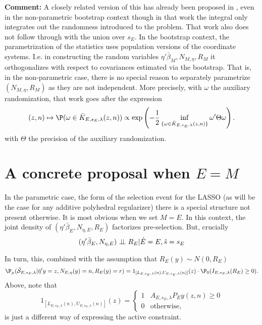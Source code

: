 \documentclass{article}
\newcommand{\OLS}{\bar{\beta}}
\newcommand{\indep}{\perp\kern-5pt\perp}
\begin{document}
        {\bf Comment:} A closely related version of this has already been
        proposed in \cite{snigdha:jelena}, even in the non-parametric
        bootstrap context though in that work the integral only
        integrates out the randomness introduced to the problem.  That
        work also does not follow through with the union over $s_E$.
        In the bootstrap context, the parametrization of the
        statistics uses population versions of the coordinate
        systems. I.e. in constructing the random variables
        $\eta'\OLS_M, N_{M,\eta}, R_M$ it orthogonalizes with respect
        to covariances estimated via the bootstrap.  That is, in the
        non-parametric case, there is no special reason to separately
        parametrize $(N_{M,\eta}, R_M)$ as they are not independent.
        More precisely, with $\omega$ the auxiliary randomization,
        that work goes after the expression
        \begin{equation}
          \label{eq:LD:rand}
        (z,n) \mapsto \P(\omega \in \bar{K}_{E,s_E,\lambda}(z,n)) \propto
          \exp\left(-\frac{1}{2} \inf_{\{\omega \in
            \bar{K}_{E,s_E,\lambda}(z,n)\}} \omega' \Theta \omega\right).
        \end{equation}
        with $\Theta$ the precision of the auxiliary randomization.

        \section{A concrete proposal when $E=M$}



        In the parametric case, the form of the selection event for
        the LASSO (as will be the case for any additive polyhedral
        regularizer) there is a special structure not present
        otherwise. It is most obvious when we set $M=E$. In this
        context, the joint density of $(\eta'\OLS_E, N_{\eta,E}, R_E)$
        factorizes pre-selection. But, crucially
        \begin{equation}
          \label{eq:cond:independence}
          (\eta'\OLS_E, N_{\eta,E}) \indep R_E | \hat{E}=E,
          \hat{s}=s_E
        \end{equation}
        
        In turn, this, combined with the assumption that $R_E(y) \sim
        N(0, R_E)$
        \begin{equation}
          \P_{\mu}(\bar{\cal S}_{E,s_E,\lambda} | \bar{\eta}'y=z,
          N_{E,\eta}(y)=n, R_E(y)=r) = 1_{[L_{E,s_E,\lambda}(n),
              U_{E,s_E,\lambda}(n)]}(z) \cdot \P_{0}(I_{E,s_E,\lambda}(R_E) \geq 0).
        \end{equation}
        Above, note that
        $$ 1_{[L_{E,s_E,\lambda}(n), U_{E,s_E,\lambda}(n)]}(z) = \begin{cases} 1 &
          A_{E,s_E,\lambda}P_Ey(z,n) \geq 0 \\ 0 & \text{otherwise,}
          \end{cases}
        $$ is just a different way of expressing the active
        constraint.
          
\end{document}
